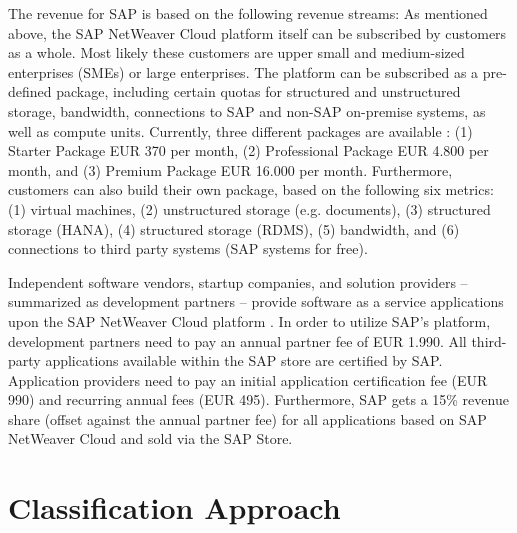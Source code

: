 The revenue for SAP is based on the following revenue streams: As mentioned above, the SAP NetWeaver Cloud platform itself can be subscribed by customers as a whole. Most likely these customers are upper small and medium-sized enterprises (SMEs) or large enterprises. The platform can be subscribed as a pre-defined package, including certain quotas for structured and unstructured storage, bandwidth, connections to SAP and non-SAP on-premise systems, as well as compute units. Currently, three different packages are available \citep{SAP2013b}: (1) Starter Package EUR 370 per month, (2) Professional Package EUR 4.800 per month, and (3) Premium Package EUR 16.000 per month. Furthermore, customers can also build their own package, based on the following six metrics: (1) virtual machines, (2) unstructured storage (e.g. documents), (3) structured storage (HANA), (4) structured storage (RDMS), (5) bandwidth, and (6) connections to third party systems (SAP systems for free). 

Independent software vendors, startup companies, and solution providers -- summarized as development partners -- provide software as a service applications upon the SAP NetWeaver Cloud platform \citep{SAP2013a}. In order to utilize SAP's platform, development partners need to pay an annual partner fee of EUR 1.990. All third-party applications available within the SAP store are certified by SAP. Application providers need to pay an initial application certification fee (EUR 990) and recurring annual fees (EUR 495). Furthermore, SAP gets a 15\% revenue share (offset against the annual partner fee) for all applications based on SAP NetWeaver Cloud and sold via the SAP Store.



\section{Classification Approach}

